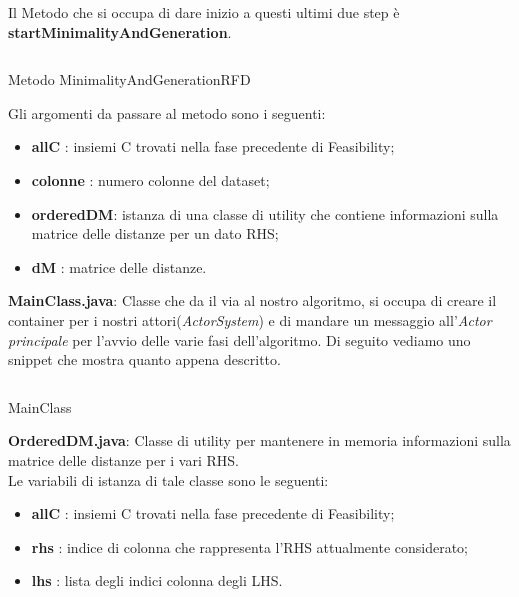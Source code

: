 Il Metodo che si occupa di dare inizio a questi ultimi due step è \textbf{startMinimalityAndGeneration}.
\begin{listing}[H]
	\inputminted[]{java}{Codici/MinimalityAndGenerationRFD.java}
	\caption{Metodo MinimalityAndGenerationRFD}
	\label{Code:6}
\end{listing}
Gli argomenti da passare al metodo sono i seguenti:
\begin{itemize}
	\item \textbf{allC} : insiemi C trovati nella fase precedente di Feasibility;
	\item \textbf{colonne} : numero colonne del dataset;
	\item \textbf{orderedDM}:  istanza di una classe di utility che contiene informazioni sulla matrice delle distanze per un dato RHS;
	\item \textbf{dM} : matrice delle distanze.
\end{itemize}
\textbf{MainClass.java}:
Classe che da il via al nostro algoritmo, si occupa di creare il container per i nostri attori(\emph{ActorSystem}) e di mandare un messaggio all'\emph{Actor principale} per l'avvio delle varie fasi dell'algoritmo.
Di seguito vediamo uno snippet che mostra quanto appena descritto.
\begin{listing}[H]
	\inputminted[]{java}{Codici/MainClass.java}
	\caption{MainClass}
	\label{Code:7}
\end{listing}
\textbf{OrderedDM.java}:
Classe di utility per mantenere in memoria informazioni sulla matrice delle distanze per i vari RHS.\\
Le variabili di istanza di tale classe sono le seguenti:
\begin{itemize}
	\item \textbf{allC} : insiemi C trovati nella fase precedente di Feasibility;
	\item \textbf{rhs} : indice di colonna che rappresenta l'RHS attualmente considerato;
	\item \textbf{lhs} : lista degli indici colonna degli LHS.
\end{itemize}
